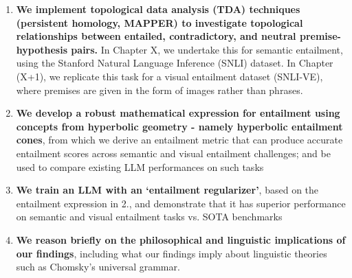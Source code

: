 \documentclass[12pt,twoside]{report}
\begin{document}
\begin{enumerate}
    \item \textbf{We implement topological data analysis (TDA) techniques (persistent homology, MAPPER) to investigate topological relationships between entailed, contradictory, and neutral premise-hypothesis pairs.} In Chapter X, we undertake this for semantic entailment, using the Stanford Natural Language Inference (SNLI) dataset. In Chapter (X+1), we replicate this task for a visual entailment dataset (SNLI-VE), where premises are given in the form of images rather than phrases.
    \item \textbf{We develop a robust mathematical expression for entailment using concepts from hyperbolic geometry - namely hyperbolic entailment cones}, from which we derive an entailment metric that can produce accurate entailment scores across semantic and visual entailment challenges; and be used to compare existing LLM performances on such tasks
    \item \textbf{We train an LLM with an `entailment regularizer'}, based on the entailment expression in 2., and demonstrate that it has superior performance on semantic and visual entailment tasks vs. SOTA benchmarks 
    \item \textbf{We reason briefly on the philosophical and linguistic implications of our findings}, including what our findings imply about linguistic theories such as Chomsky's universal grammar. 
\end{enumerate}
\end{document}
